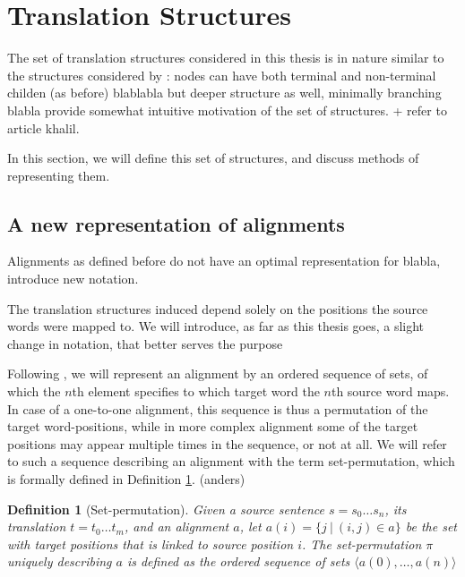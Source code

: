 \documentclass{report}
\theoremstyle{definition}
\theoremstyle{plain}
\newtheorem{definition}{Definition}
\begin{document}
\section{Translation Structures}

The set of translation structures considered in this thesis is in nature similar to the structures considered by \cite{chiang2005hierarchical}: nodes can have both terminal and non-terminal childen (as before) blablabla but deeper structure as well, minimally branching blabla provide somewhat intuitive motivation of the set of structures. + refer to article khalil.

In this section, we will define this set of structures, and discuss methods of representing them.


\subsection{A new representation of alignments}

Alignments as defined before do not have an optimal representation for blabla, introduce new notation.

The translation structures induced depend solely on the positions the source words were mapped to. We will introduce, as far as this thesis goes, a slight change in notation, that better serves the purpose

Following \cite{simaan2013hats}, we will represent an alignment by an ordered sequence of sets, of which the $n$th element specifies to which target word the $n$th source word maps. In case of a one-to-one alignment, this sequence is thus a permutation of the target word-positions, while in more complex alignment some of the target positions may appear multiple times in the sequence, or not at all. We will refer to such a sequence describing an alignment with the term set-permutation, which is formally defined in Definition \ref{def:sperm}. (anders)


\begin{definition}[Set-permutation]\label{def:sperm}
Given a source sentence $s = s_0 \ldots s_n$, its translation $t = t_0 \ldots t_m$, and an alignment $a$, let $a(i) = \{j~|~(i,j)\in a\}$ be the set with target positions that is linked to source position $i$. The set-permutation $\pi$ uniquely describing $a$ is defined as the ordered sequence of sets
$\langle a(0), \ldots, a(n) \rangle$
\end{definition}
\end{document}
